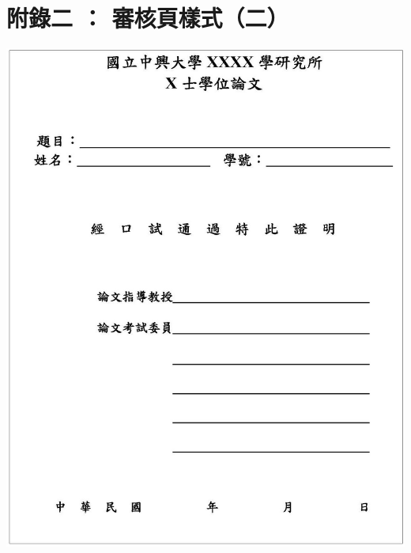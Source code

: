 \chapter{附錄二 ： 審核頁樣式（二）}
    \begin{center}
        \includegraphics[bb=0 0 1224 1527,width=\textwidth]{examine2.jpg}
    \end{center}

